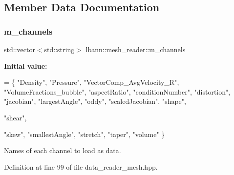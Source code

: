 \subsection{Member Data Documentation}
\mbox{\label{classlbann_1_1mesh__reader_a9260add45b0421acb0ab28dd8f6d8cc6}} 
\subsubsection{\texorpdfstring{m\+\_\+channels}{m\_channels}}
{\footnotesize\ttfamily std\+::vector$<$std\+::string$>$ lbann\+::mesh\+\_\+reader\+::m\+\_\+channels\hspace{0.3cm}{\ttfamily [protected]}}

{\bfseries Initial value\+:}
\begin{DoxyCode}
= \{
    \textcolor{stringliteral}{"Density"},
    \textcolor{stringliteral}{"Pressure"},
    \textcolor{stringliteral}{"VectorComp\_AvgVelocity\_R"},
    \textcolor{stringliteral}{"VolumeFractions\_bubble"},
    \textcolor{stringliteral}{"aspectRatio"},
    \textcolor{stringliteral}{"conditionNumber"},
    \textcolor{stringliteral}{"distortion"},
    \textcolor{stringliteral}{"jacobian"},
    \textcolor{stringliteral}{"largestAngle"},
    \textcolor{stringliteral}{"oddy"},
    \textcolor{stringliteral}{"scaledJacobian"},
    \textcolor{stringliteral}{"shape"},
    
    \textcolor{stringliteral}{"shear"},
    
    \textcolor{stringliteral}{"skew"},
    \textcolor{stringliteral}{"smallestAngle"},
    \textcolor{stringliteral}{"stretch"},
    \textcolor{stringliteral}{"taper"},
    \textcolor{stringliteral}{"volume"}
  \}
\end{DoxyCode}


Names of each channel to load as data. 



Definition at line 99 of file data\+\_\+reader\+\_\+mesh.\+hpp.

\mbox{\label{classlbann_1_1mesh__reader_aeb4e0df4e0be56244df5b663e2940d11}} 
